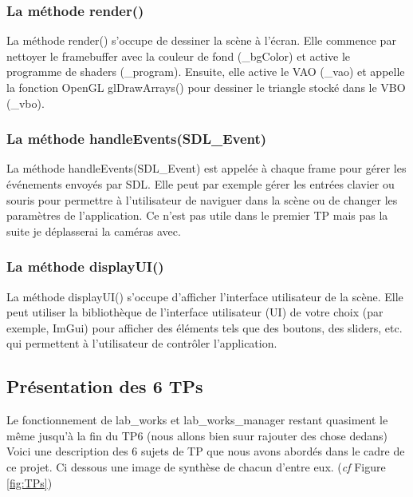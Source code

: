 \documentclass[10pt,a4paper]{article}
\begin{document}
		\subsubsection{La méthode render()} %
			La méthode render() s'occupe de dessiner la scène à l'écran. Elle commence par nettoyer le framebuffer avec la couleur de fond (\_bgColor) et active le programme de shaders (\_program). Ensuite, elle active le VAO (\_vao) et appelle la fonction OpenGL glDrawArrays() pour dessiner le triangle stocké dans le VBO (\_vbo).

		\subsubsection{La méthode handleEvents(SDL\_Event)} %
			La méthode handleEvents(SDL\_Event) est appelée à chaque frame pour gérer les événements envoyés par SDL. Elle peut par exemple gérer les entrées clavier ou souris pour permettre à l'utilisateur de naviguer dans la scène ou de changer les paramètres de l'application. Ce n'est pas utile dans le premier TP mais pas la suite je déplasserai la caméras avec. 

		\subsubsection{La méthode displayUI()} %
			La méthode displayUI() s'occupe d'afficher l'interface utilisateur de la scène. Elle peut utiliser la bibliothèque de l'interface utilisateur (UI) de votre choix (par exemple, ImGui) pour afficher des éléments tels que des boutons, des sliders, etc. qui permettent à l'utilisateur de contrôler l'application.

		\subsection{Présentation des 6 TPs} %
			Le fonctionnement de lab\_works et lab\_works\_manager restant quasiment le même jusqu'à la fin du TP6 (nous allons bien suur rajouter des chose dedans) Voici une description des 6 sujets de TP que nous avons abordés dans le cadre de ce projet. Ci dessous une image de synthèse de chacun d'entre eux. (\textit{cf} Figure \ref{fig:TPs})
\end{document}
